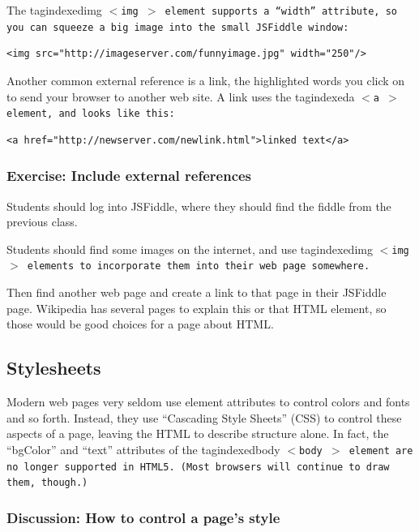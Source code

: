 \documentclass[11pt]{article}
\makeatletter
\newcommand{\tag}[2][\relax]{%
  \ifcsname tagindexed#2\endcsname\relax\else%
  \index{#2@\texttt{$<$#2$>$}}%
  \expandafter\gdef\csname tagindexed#2\endcsname{\relax}\fi%
  \bgroup\tt$<$#2\ifx#1\relax\relax\else~#1\fi$>$\egroup}
\makeatother
\begin{document}
The \tag{img} element supports a ``width'' attribute,
so you can squeeze a big image into the small JSFiddle window:

\begin{verbatim}
<img src="http://imageserver.com/funnyimage.jpg" width="250"/>
\end{verbatim}

Another common external reference is a link, the highlighted words you
click on to send your browser to another web site.  A link uses the
\tag{a} element, and looks like this:

\begin{verbatim}
<a href="http://newserver.com/newlink.html">linked text</a>
\end{verbatim}



\subsubsection{Exercise: Include external references}

Students should log into JSFiddle, where they should find the fiddle
from the previous class.

Students should find some images on the internet, and use \tag{img}
elements to incorporate them into their web page somewhere.

Then find another web page and create a link to that page in their
JSFiddle page.  Wikipedia has several pages to explain this or that
HTML element, so those would be good choices for a page about HTML.

\subsection{Stylesheets}

Modern web pages very seldom use element attributes to control colors
and fonts and so forth.  Instead, they use ``Cascading Style Sheets''
(CSS) to control these aspects of a page, leaving the HTML to describe
structure alone.  In fact, the ``bgColor'' and ``text'' attributes
of the \tag{body} element are no longer supported in HTML5.  (Most
browsers will continue to draw them, though.)

\subsubsection{Discussion: How to control a page's style}
\end{document}
